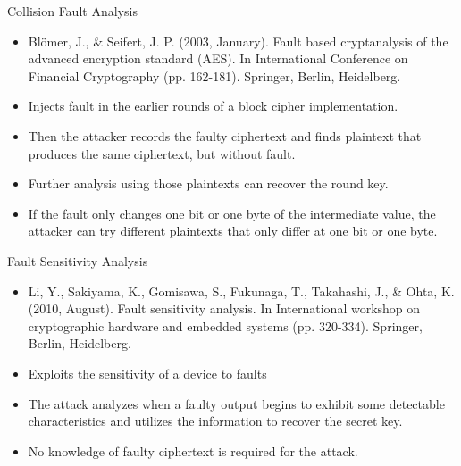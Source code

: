 \begin{frame}{Collision Fault Analysis}
    \begin{itemize}
        \item Blömer, J., \& Seifert, J. P. (2003, January). Fault based cryptanalysis of the advanced encryption standard (AES). In International Conference on Financial Cryptography (pp. 162-181). Springer, Berlin, Heidelberg.
        \item Injects fault in the earlier rounds of a block cipher implementation.
        \item Then the attacker records the faulty ciphertext and finds plaintext that produces the same ciphertext, but without fault.
        \item Further analysis using those plaintexts can recover the round key.
        \item If the fault only changes one bit or one byte of the intermediate value, the attacker can try different plaintexts that only differ at one bit or one byte.
    \end{itemize}
\end{frame}

\begin{frame}{Fault Sensitivity Analysis}
    \begin{itemize}
        \item Li, Y., Sakiyama, K., Gomisawa, S., Fukunaga, T., Takahashi, J., \& Ohta, K. (2010, August). Fault sensitivity analysis. In International workshop on cryptographic hardware and embedded systems (pp. 320-334). Springer, Berlin, Heidelberg.
        \item Exploits the sensitivity of a device to faults
        \item The attack analyzes when a faulty output begins to exhibit some detectable characteristics and utilizes the information to recover the secret key.
        \item No knowledge of faulty ciphertext is required for the attack.
    \end{itemize}
\end{frame}

